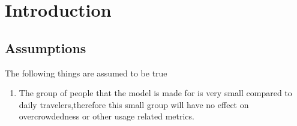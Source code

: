 \section{Introduction}
\subsection{Assumptions}
The following things are assumed to be true
\begin{enumerate}
    \item The group of people that the model is made for is very small compared to daily travelers,therefore this small group will have no effect on overcrowdedness or other usage related metrics. \label{assum:smallgroup}
\end{enumerate}